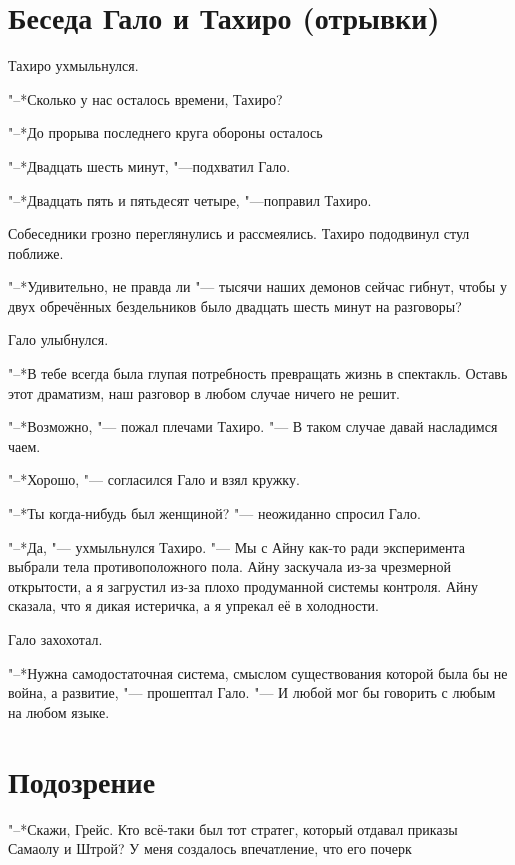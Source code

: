 \section{Беседа Гало и Тахиро (отрывки)}

Тахиро ухмыльнулся.

"--*Сколько у нас осталось времени, Тахиро?

"--*До прорыва последнего круга обороны осталось\ldotst

"--*Двадцать шесть минут, "---подхватил Гало.

"--*Двадцать пять и пятьдесят четыре, "---поправил Тахиро.

Собеседники грозно переглянулись и рассмеялись.
Тахиро пододвинул стул поближе.

"--*Удивительно, не правда ли "--- тысячи наших демонов сейчас гибнут, чтобы у двух обречённых бездельников было двадцать шесть минут на разговоры?

Гало улыбнулся.

"--*В тебе всегда была глупая потребность превращать жизнь в спектакль.
Оставь этот драматизм, наш разговор в любом случае ничего не решит.

"--*Возможно, "--- пожал плечами Тахиро.
"--- В таком случае давай насладимся чаем.

"--*Хорошо, "--- согласился Гало и взял кружку.

\spacing

"--*Ты когда-нибудь был женщиной? "--- неожиданно спросил Гало.

"--*Да, "--- ухмыльнулся Тахиро.
"--- Мы с Айну как-то ради эксперимента выбрали тела противоположного пола.
Айну заскучала из-за чрезмерной открытости, а я загрустил из-за плохо продуманной системы контроля.
Айну сказала, что я дикая истеричка, а я упрекал её в холодности.

Гало захохотал.

\spacing

"--*Нужна самодостаточная система, смыслом существования которой была бы не война, а развитие, "--- прошептал Гало.
"--- И любой мог бы говорить с любым на любом языке.

\section{Подозрение}

"--*Скажи, Грейс.
Кто всё-таки был тот стратег, который отдавал приказы Самаолу и Штрой?
У меня создалось впечатление, что его почерк\ldotst

